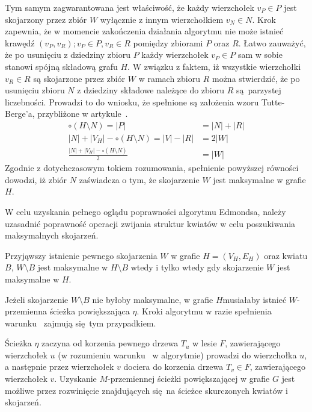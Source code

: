 {\begin{bproof}
    Tym samym zagwarantowana jest właściwość, że każdy wierzchołek $v_P \in P$ jest skojarzony przez zbiór $W$ wyłącznie z innym wierzchołkiem $v_N \in N$.
    Krok~ zapewnia, że w momencie zakończenia działania algorytmu nie może istnieć krawędź $(v_P, v_R); v_P \in P, v_R \in R$ pomiędzy zbiorami $P$ oraz $R$.
    Łatwo zauważyć, że po usunięciu z dziedziny zbioru $P$ każdy wierzchołek $v_P \in P$ sam w sobie stanowi spójną składową grafu $H$.
    W związku z faktem, iż wszystkie wierzchołki $v_R \in R$ są skojarzone przez zbiór $W$ w ramach zbioru $R$ można stwierdzić, że po usunięciu zbioru $N$ z dziedziny składowe należące do zbioru $R$ są parzystej liczebności.
    Prowadzi to do wniosku, że spełnione są założenia wzoru Tutte-Berge'a, przybliżone w artykule~\cite{cohen:hal-00358468}.
    \begin{align*}
        \circ(H \setminus N) = |P| &= |N| + |R|\\
        |N| + |V_H| - \circ(H \setminus N) = |V| - |R| &= 2|W|\\
        \frac{|N| + |V_H| - \circ (H \setminus N)}{2} &= |W|
    \end{align*}
    Zgodnie z dotychczasowym tokiem rozumowania, spełnienie powyższej równości dowodzi, iż zbiór $N$ zaświadcza o tym, że skojarzenie $W$ jest maksymalne w grafie $H$.
  \end{bproof}
  W celu uzyskania pełnego oglądu poprawności algorytmu Edmondsa, należy uzasadnić poprawność operacji zwijania struktur kwiatów w celu poszukiwania maksymalnych skojarzeń.
  \begin{theorem}
    Przyjąwszy istnienie pewnego skojarzenia $W$ w grafie $H=(V_H, E_H)$ oraz kwiatu $B$, $W \setminus B$ jest maksymalne w $H \setminus B$ wtedy i tylko wtedy gdy skojarzenie $W$ jest maksymalne w $H$.
  \end{theorem}
  \begin{bproof}
    Jeżeli skojarzenie $W \setminus B$ nie byłoby maksymalne, w grafie $H$musiałaby istnieć $W$-przemienna ścieżka powiększająca $\eta$.
    Kroki algorytmu w razie spełnienia warunku~ zajmują się tym przypadkiem.

    Ścieżka $\eta$ zaczyna od korzenia pewnego drzewa $T_u$ w lesie $F$, zawierającego wierzchołek $u$ (w rozumieniu warunku~ w algorytmie) prowadzi do wierzchołka $u$, a następnie przez wierzchołek $v$ dociera do korzenia drzewa $T_v \in F$, zawierającego wierzchołek $v$.
    Uzyskanie $M$-przemiennej ścieżki powiększającej w grafie $G$ jest możliwe przez rozwinięcie znajdujących się na ścieżce skurczonych kwiatów i 
    skojarzeń.


\end{bproof}}
